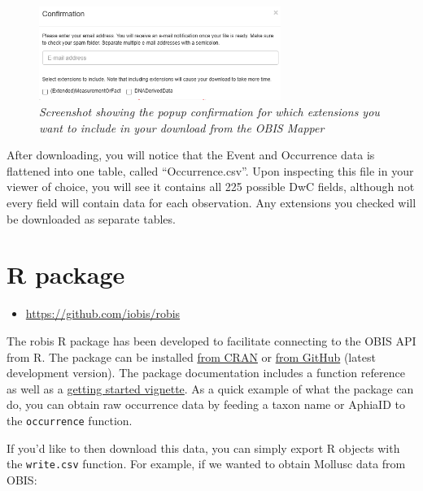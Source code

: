 \documentclass[
  letterpaper,
  DIV=11,
  numbers=noendperiod,
  oneside]{scrreprt}
\providecommand{\tightlist}{%
  \setlength{\itemsep}{0pt}\setlength{\parskip}{0pt}}\usepackage{longtable,booktabs,array}
\begin{document}
\begin{figure}

{\centering \includegraphics[width=0.7\textwidth,height=\textheight]{images/mapper-extensions.png}

}

\caption{\emph{Screenshot showing the popup confirmation for which
extensions you want to include in your download from the OBIS Mapper}}

\end{figure}

After downloading, you will notice that the Event and Occurrence data is
flattened into one table, called ``Occurrence.csv''. Upon inspecting
this file in your viewer of choice, you will see it contains all 225
possible DwC fields, although not every field will contain data for each
observation. Any extensions you checked will be downloaded as separate
tables.

\hypertarget{r-package}{%
\section{R package}\label{r-package}}

\begin{itemize}
\tightlist
\item
  \url{https://github.com/iobis/robis}
\end{itemize}

The robis R package has been developed to facilitate connecting to the
OBIS API from R. The package can be installed
\href{https://cran.r-project.org/web/packages/robis/index.html}{from
CRAN} or \href{https://github.com/iobis/robis}{from GitHub} (latest
development version). The package documentation includes a function
reference as well as a
\href{https://iobis.github.io/robis/articles/getting-started.html}{getting
started vignette}. As a quick example of what the package can do, you
can obtain raw occurrence data by feeding a taxon name or AphiaID to the
\texttt{occurrence} function.

If you'd like to then download this data, you can simply export R
objects with the \texttt{write.csv} function. For example, if we wanted
to obtain Mollusc data from OBIS:
\end{document}
